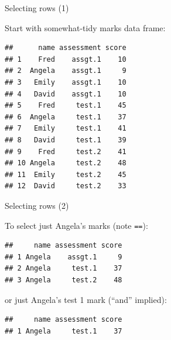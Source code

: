 \begin{frame}[fragile]{Selecting rows (1)}
  
  Start with somewhat-tidy marks data frame:
  
\begin{knitrout}
\color{fgcolor}\begin{kframe}
\begin{alltt}
\end{alltt}
\begin{verbatim}
##      name assessment score
## 1    Fred    assgt.1    10
## 2  Angela    assgt.1     9
## 3   Emily    assgt.1    10
## 4   David    assgt.1    10
## 5    Fred     test.1    45
## 6  Angela     test.1    37
## 7   Emily     test.1    41
## 8   David     test.1    39
## 9    Fred     test.2    41
## 10 Angela     test.2    48
## 11  Emily     test.2    45
## 12  David     test.2    33
\end{verbatim}
\end{kframe}
\end{knitrout}


  
  
\end{frame}

\begin{frame}[fragile]{Selecting rows (2)}
  
  To select just Angela's marks (note \texttt{==}):
  
\begin{knitrout}
\color{fgcolor}\begin{kframe}
\begin{alltt}
\hlopt{==}\hlstd{)}
\end{alltt}
\begin{verbatim}
##     name assessment score
## 1 Angela    assgt.1     9
## 2 Angela     test.1    37
## 3 Angela     test.2    48
\end{verbatim}
\end{kframe}
\end{knitrout}

or just Angela's test 1 mark (``and'' implied):

\begin{knitrout}
\color{fgcolor}\begin{kframe}
\begin{alltt}
\hlopt{==}\hlopt{==}\hlstd{)}
\end{alltt}
\begin{verbatim}
##     name assessment score
## 1 Angela     test.1    37
\end{verbatim}
\end{kframe}
\end{knitrout}
  
\end{frame}

